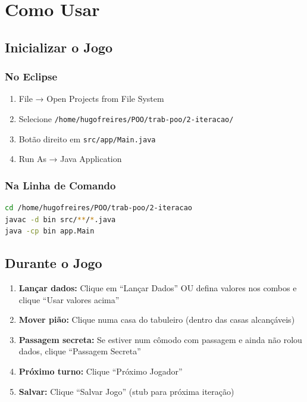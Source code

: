 \documentclass[12pt,a4paper]{report}
\begin{document}
\chapter{Como Usar}

\section{Inicializar o Jogo}

\subsection{No Eclipse}

\begin{enumerate}
    \item File → Open Projects from File System
    \item Selecione \texttt{/home/hugofreires/POO/trab-poo/2-iteracao/}
    \item Botão direito em \texttt{src/app/Main.java}
    \item Run As → Java Application
\end{enumerate}

\subsection{Na Linha de Comando}

\begin{lstlisting}[language=bash]
cd /home/hugofreires/POO/trab-poo/2-iteracao
javac -d bin src/**/*.java
java -cp bin app.Main
\end{lstlisting}

\section{Durante o Jogo}

\begin{enumerate}
    \item \textbf{Lançar dados:} Clique em ``Lançar Dados'' OU defina valores nos combos e clique ``Usar valores acima''
    \item \textbf{Mover pião:} Clique numa casa do tabuleiro (dentro das casas alcançáveis)
    \item \textbf{Passagem secreta:} Se estiver num cômodo com passagem e ainda não rolou dados, clique ``Passagem Secreta''
    \item \textbf{Próximo turno:} Clique ``Próximo Jogador''
    \item \textbf{Salvar:} Clique ``Salvar Jogo'' (stub para próxima iteração)
\end{enumerate}
\end{document}
